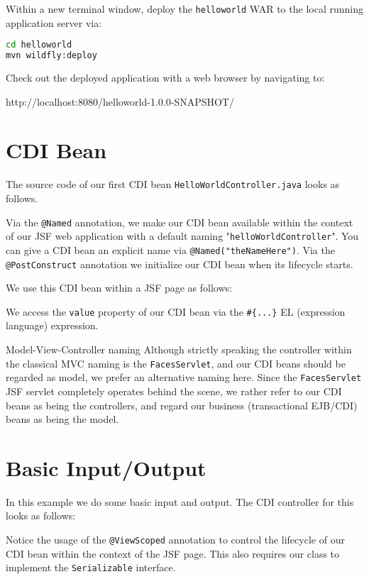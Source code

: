 Within a new terminal window, deploy the \texttt{helloworld} WAR to the local running application server via:
\begin{lstlisting}[language=bash]
cd helloworld
mvn wildfly:deploy
\end{lstlisting}

Check out the deployed application with a web browser by navigating to:

http://localhost:8080/helloworld-1.0.0-SNAPSHOT/

\section{CDI Bean}

The source code of our first CDI \cite{CDI2} bean \texttt{HelloWorldController.java} looks as follows.

Via the \texttt{@Named} annotation, we make our CDI bean available within the context of our JSF web application with a default naming "\texttt{helloWorldController}".
You can give a CDI bean an explicit name via \texttt{@Named("theNameHere")}.
Via the \texttt{@PostConstruct} annotation we initialize our CDI bean when its lifecycle starts.

We use this CDI bean within a JSF page as follows:

We access the \texttt{value} property of our CDI bean via the \texttt{\#\{...\}} EL (expression language) expression.

\begin{TIP}{Model-View-Controller naming}
	Although strictly speaking the controller within the classical MVC naming is the \texttt{FacesServlet}, and our CDI beans should be regarded as model,
	we prefer an alternative naming here.
	Since the \texttt{FacesServlet} JSF servlet completely operates behind the scene, we rather refer to our CDI beans as being the controllers,
	and regard our business (transactional EJB/CDI) beans as being the model.
\end{TIP}

\section{Basic Input/Output}
\label{sec:basic-input-output}

In this example we do some basic input and output.
The CDI controller for this looks as follows:

Notice the usage of the \texttt{@ViewScoped} annotation to control the lifecycle of our CDI bean within the context of the JSF page.
This also requires our class to implement the \texttt{Serializable} interface.

